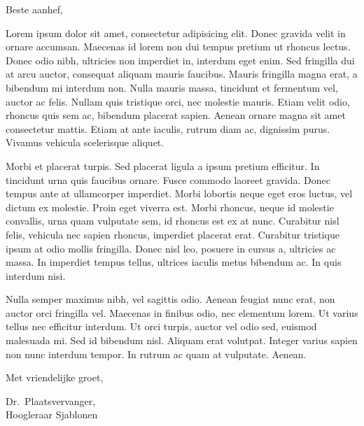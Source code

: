 \documentclass[11pt]{letter}
\date{January 1, 1970}
\begin{document}
\begin{letterhead}

 Beste aanhef,

 Lorem ipsum dolor sit amet, consectetur adipisicing elit. Donec gravida velit in ornare accumsan. Maecenas id lorem non dui tempus pretium ut rhoncus lectus. Donec odio nibh, ultricies non imperdiet in, interdum eget enim. Sed fringilla dui at arcu auctor, consequat aliquam mauris faucibus. Mauris fringilla magna erat, a bibendum mi interdum non. Nulla mauris massa, tincidunt et fermentum vel, auctor ac felis. Nullam quis tristique orci, nec molestie mauris. Etiam velit odio, rhoncus quis sem ac, bibendum placerat sapien. Aenean ornare magna sit amet consectetur mattis. Etiam at ante iaculis, rutrum diam ac, dignissim purus. Vivamus vehicula scelerisque aliquet.

 Morbi et placerat turpis. Sed placerat ligula a ipsum pretium efficitur. In tincidunt urna quis faucibus ornare. Fusce commodo laoreet gravida. Donec tempus ante at ullamcorper imperdiet. Morbi lobortis neque eget eros luctus, vel dictum ex molestie. Proin eget viverra est. Morbi rhoncus, neque id molestie convallis, urna quam vulputate sem, id rhoncus est ex at nunc. Curabitur nisl felis, vehicula nec sapien rhoncus, imperdiet placerat erat. Curabitur tristique ipsum at odio mollis fringilla. Donec nisl leo, posuere in cursus a, ultricies ac massa. In imperdiet tempus tellus, ultrices iaculis metus bibendum ac. In quis interdum nisi.

 Nulla semper maximus nibh, vel sagittis odio. Aenean feugiat nunc erat, non auctor orci fringilla vel. Maecenas in finibus odio, nec elementum lorem. Ut varius tellus nec efficitur interdum. Ut orci turpis, auctor vel odio sed, euismod malesuada mi. Sed id bibendum nisl. Aliquam erat volutpat. Integer varius sapien non nunc interdum tempor. In rutrum ac quam at vulputate. Aenean.

 Met vriendelijke groet,

 Dr.~Plaatsvervanger, \\ Hoogleraar Sjablonen

\end{letterhead}
\end{document}
